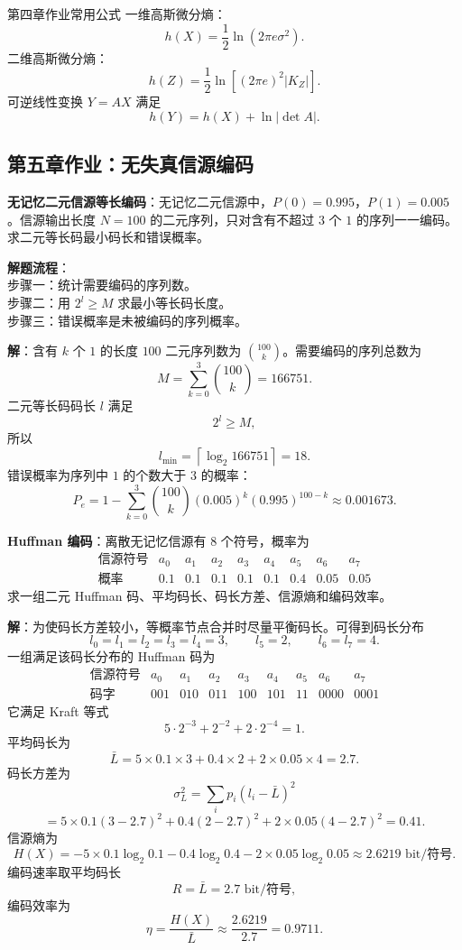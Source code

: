 \begin{formulaBox}{第四章作业常用公式}
一维高斯微分熵：
\[
h(X)=\frac12\ln(2\pi e\sigma^2).
\]
二维高斯微分熵：
\[
h(Z)=\frac12\ln\left[(2\pi e)^2|K_Z|\right].
\]
可逆线性变换 $Y=AX$ 满足
\[
h(Y)=h(X)+\ln|\det A|.
\]
\end{formulaBox}

\subsection{第五章作业：无失真信源编码}

\begin{example}
\label{hw:ch5-binary-source-fixed-length-coding}
\textbf{无记忆二元信源等长编码}：无记忆二元信源中，$P(0)=0.995$，$P(1)=0.005$。信源输出长度 $N=100$ 的二元序列，只对含有不超过 $3$ 个 $1$ 的序列一一编码。求二元等长码最小码长和错误概率。

\noindent \textbf{解题流程}：\\[2pt]
步骤一：统计需要编码的序列数。\\
步骤二：用 $2^l\ge M$ 求最小等长码长度。\\
步骤三：错误概率是未被编码的序列概率。

\textbf{解}：含有 $k$ 个 $1$ 的长度 $100$ 二元序列数为 $\binom{100}{k}$。需要编码的序列总数为
\[
M=\sum_{k=0}^{3}\binom{100}{k}
=166751.
\]
二元等长码码长 $l$ 满足
\[
2^l\ge M,
\]
所以
\[
l_{\min}=\left\lceil\log_2 166751\right\rceil=18.
\]
错误概率为序列中 $1$ 的个数大于 $3$ 的概率：
\[
P_e=1-\sum_{k=0}^{3}\binom{100}{k}(0.005)^k(0.995)^{100-k}
\approx0.001673.
\]
\end{example}

\begin{example}
\label{hw:ch5-huffman-coding}
\textbf{Huffman 编码}：离散无记忆信源有 $8$ 个符号，概率为
\[
\begin{array}{c|cccccccc}
\text{信源符号} & a_0&a_1&a_2&a_3&a_4&a_5&a_6&a_7\\
\hline
\text{概率} & 0.1&0.1&0.1&0.1&0.1&0.4&0.05&0.05
\end{array}
\]
求一组二元 Huffman 码、平均码长、码长方差、信源熵和编码效率。

\textbf{解}：为使码长方差较小，等概率节点合并时尽量平衡码长。可得到码长分布
\[
l_0=l_1=l_2=l_3=l_4=3,
\qquad
l_5=2,
\qquad
l_6=l_7=4.
\]
一组满足该码长分布的 Huffman 码为
\[
\begin{array}{c|cccccccc}
\text{信源符号} & a_0&a_1&a_2&a_3&a_4&a_5&a_6&a_7\\
\hline
\text{码字} & 001&010&011&100&101&11&0000&0001
\end{array}
\]
它满足 Kraft 等式
\[
5\cdot2^{-3}+2^{-2}+2\cdot2^{-4}=1.
\]
平均码长为
\[
\bar L=5\times0.1\times3+0.4\times2+2\times0.05\times4=2.7.
\]
码长方差为
\[
\sigma_L^2=\sum_i p_i(l_i-\bar L)^2
\]
\[
=5\times0.1(3-2.7)^2+0.4(2-2.7)^2+2\times0.05(4-2.7)^2
=0.41.
\]
信源熵为
\[
H(X)=-5\times0.1\log_2 0.1-0.4\log_2 0.4-2\times0.05\log_2 0.05
\approx2.6219\text{ bit/符号}.
\]
编码速率取平均码长
\[
R=\bar L=2.7\text{ bit/符号},
\]
编码效率为
\[
\eta=\frac{H(X)}{\bar L}\approx\frac{2.6219}{2.7}=0.9711.
\]
\end{example}

